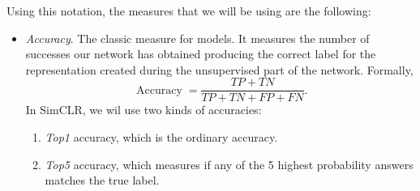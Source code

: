 Using this notation, the measures that we will be using are the following:

\begin{itemize}
\item \emph{Accuracy}. The classic measure for models. It measures the number of successes our network has obtained producing the correct label for the representation created during the unsupervised part of the network. Formally,
\[
\operatorname{Accuracy} = \frac{TP + TN}{TP + TN + FP + FN}  .  
\] 
In SimCLR, we wil use two kinds of accuracies:
\begin{enumerate}
\item \emph{Top1} accuracy, which is the ordinary accuracy.
\item \emph{Top5} accuracy, which measures if any of the 5 highest probability answers matches the true label.
\end{enumerate}
\end{itemize}




